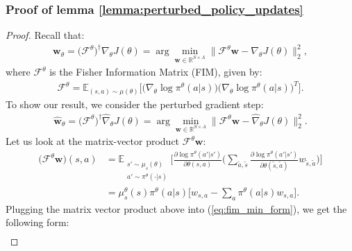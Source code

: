 \subsubsection{Proof of lemma \ref{lemma:perturbed_policy_updates}}
\label{sec:proof_perturbed_policy_update}
\begin{proof}
    Recall that:
    \begin{align}
        \label{eq:fim_min_form}
        \bm{w}_\theta 
        = \bigl(\mathcal{F}^\theta\bigr)^\dagger \nabla_\theta J(\theta) 
        = \arg\min_{\bm{w}\in \mathbb{R}^{S\times A}} 
        \Big\|
        \mathcal{F}^\theta \textbf{w} - \nabla_\theta J (\theta)
        \Big\|_2^2,
    \end{align}
    where $\mathcal{F}^\theta$ is the Fisher Information Matrix (FIM), given by:
    \begin{align*}
        \mathcal{F}^\theta = \mathbb{E}_{(s,a) \sim \mu(\theta)}
        \Bigg[
            \big(  \nabla_\theta \log \pi^\theta(a|s)  \big)
            \big(  \nabla_\theta \log \pi^\theta(a|s)  \big)^T
            \Bigg].
        \end{align*}
        To show our result, we consider the perturbed gradient step:
        \begin{align*}
            \hat{\bm{w}}_\theta 
            = \bigl(\mathcal{F}^\theta\bigr)^\dagger \hat{\nabla}_\theta J(\theta) 
            = \arg\min_{\bm{w}\in \mathbb{R}^{S\times A}} 
            \Big\|
            \mathcal{F}^\theta \textbf{w} - \hat{\nabla}_\theta J (\theta)
            \Big\|_2^2.
        \end{align*}
        Let us look at the matrix-vector product $\mathcal{F}^\theta \bm{w}$:
        \begin{align*}
            \big( \mathcal{F}^\theta \bm{w} \big)(s,a) &
            = \mathbb{E}_{\substack{s' \sim \mu_s(\theta) \\ a' \sim \pi^\theta(\cdot | s)}}
            \Bigg[
                \frac{\partial \log \pi^\theta(a'|s')}{\partial \theta(s,a)}
                \Big( \sum_{\tilde{a},\tilde{s}} \frac{\partial \log \pi^\theta(a'|s')}{\partial \theta(\tilde{s},\tilde{a})}  w_{\tilde{s},\tilde{a}} \Big)
            \Bigg]\\
            & =
            \mu_s^\theta(s) \pi^\theta(a|s) \Bigg[ w_{s,a} - \sum_a \pi^\theta(a|s) w_{s,a}  \Bigg].
        \end{align*}
        Plugging the matrix vector product above into (\ref{eq:fim_min_form}), we get the following form:
        \begin{align*}

\end{align*}
\end{proof}
